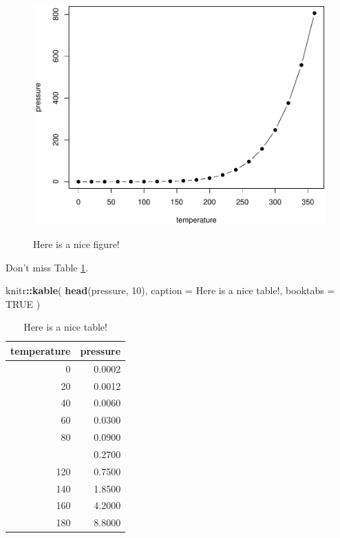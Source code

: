 \documentclass[
]{book}
\newenvironment{Shaded}{\begin{snugshade}}{\end{snugshade}}
\newcommand{\AttributeTok}[1]{\textcolor[rgb]{0.13,0.29,0.53}{#1}}
\newcommand{\ConstantTok}[1]{\textcolor[rgb]{0.56,0.35,0.01}{#1}}
\newcommand{\DecValTok}[1]{\textcolor[rgb]{0.00,0.00,0.81}{#1}}
\newcommand{\FunctionTok}[1]{\textcolor[rgb]{0.13,0.29,0.53}{\textbf{#1}}}
\newcommand{\NormalTok}[1]{#1}
\newcommand{\SpecialCharTok}[1]{\textcolor[rgb]{0.81,0.36,0.00}{\textbf{#1}}}
\newcommand{\StringTok}[1]{\textcolor[rgb]{0.31,0.60,0.02}{#1}}
\theoremstyle{definition}
\theoremstyle{definition}
\theoremstyle{definition}
\theoremstyle{definition}
\theoremstyle{remark}
\begin{document}
\begin{figure}

{\centering \includegraphics[width=0.8\linewidth,alt={Plot with connected points showing that vapor pressure of mercury increases exponentially as temperature increases.}]{02-cross-refs_files/figure-latex/nice-fig-1} 

}

\caption{Here is a nice figure!}\label{fig:nice-fig}
\end{figure}

Don't miss Table \ref{tab:nice-tab}.

\begin{Shaded}
\begin{Highlighting}[]
\NormalTok{knitr}\SpecialCharTok{::}\FunctionTok{kable}\NormalTok{(}
  \FunctionTok{head}\NormalTok{(pressure, }\DecValTok{10}\NormalTok{), }\AttributeTok{caption =} \StringTok{\textquotesingle{}Here is a nice table!\textquotesingle{}}\NormalTok{,}
  \AttributeTok{booktabs =} \ConstantTok{TRUE}
\NormalTok{)}
\end{Highlighting}
\end{Shaded}

\begin{table}

\caption{\label{tab:nice-tab}Here is a nice table!}
\centering
\begin{tabular}[t]{rr}
\toprule
temperature & pressure\\
\midrule
0 & 0.0002\\
20 & 0.0012\\
40 & 0.0060\\
60 & 0.0300\\
80 & 0.0900\\
\addlinespace
100 & 0.2700\\
120 & 0.7500\\
140 & 1.8500\\
160 & 4.2000\\
180 & 8.8000\\
\bottomrule
\end{tabular}
\end{table}
\end{document}
